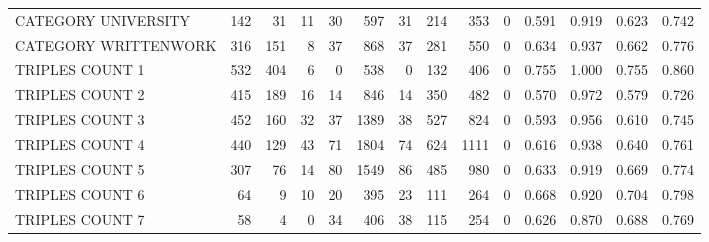 \begin{tabular}{lrrrrrrrrrllll}
 CATEGORY UNIVERSITY      &             142 &            31 &              11 &              30 &             597 &   31 &  214 &  353 &    0 & 0.591 & 0.919 & 0.623 & 0.742 \\
 CATEGORY WRITTENWORK     &             316 &           151 &               8 &              37 &             868 &   37 &  281 &  550 &    0 & 0.634 & 0.937 & 0.662 & 0.776 \\
 TRIPLES COUNT 1          &             532 &           404 &               6 &               0 &             538 &    0 &  132 &  406 &    0 & 0.755 & 1.000 & 0.755 & 0.860 \\
 TRIPLES COUNT 2          &             415 &           189 &              16 &              14 &             846 &   14 &  350 &  482 &    0 & 0.570 & 0.972 & 0.579 & 0.726 \\
 TRIPLES COUNT 3          &             452 &           160 &              32 &              37 &            1389 &   38 &  527 &  824 &    0 & 0.593 & 0.956 & 0.610 & 0.745 \\
 TRIPLES COUNT 4          &             440 &           129 &              43 &              71 &            1804 &   74 &  624 & 1111 &    0 & 0.616 & 0.938 & 0.640 & 0.761 \\
 TRIPLES COUNT 5          &             307 &            76 &              14 &              80 &            1549 &   86 &  485 &  980 &    0 & 0.633 & 0.919 & 0.669 & 0.774 \\
 TRIPLES COUNT 6          &              64 &             9 &              10 &              20 &             395 &   23 &  111 &  264 &    0 & 0.668 & 0.920 & 0.704 & 0.798 \\
 TRIPLES COUNT 7          &              58 &             4 &               0 &              34 &             406 &   38 &  115 &  254 &    0 & 0.626 & 0.870 & 0.688 & 0.769 \\
\hline
\end{tabular}